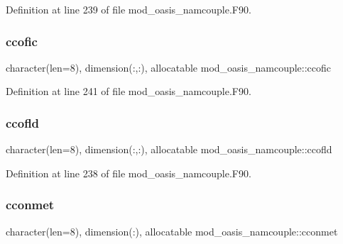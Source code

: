 Definition at line 239 of file mod\+\_\+oasis\+\_\+namcouple.\+F90.

\mbox{\label{namespacemod__oasis__namcouple_a009543dda4495ab9b5ac3fcf15767682}} 
\subsubsection{\texorpdfstring{ccofic}{ccofic}}
{\footnotesize\ttfamily character(len=8), dimension(\+:,\+:), allocatable mod\+\_\+oasis\+\_\+namcouple\+::ccofic\hspace{0.3cm}{\ttfamily [private]}}



Definition at line 241 of file mod\+\_\+oasis\+\_\+namcouple.\+F90.

\mbox{\label{namespacemod__oasis__namcouple_af8d81a53bd28ddf6bfe19f5e05f1d867}} 
\subsubsection{\texorpdfstring{ccofld}{ccofld}}
{\footnotesize\ttfamily character(len=8), dimension(\+:,\+:), allocatable mod\+\_\+oasis\+\_\+namcouple\+::ccofld\hspace{0.3cm}{\ttfamily [private]}}



Definition at line 238 of file mod\+\_\+oasis\+\_\+namcouple.\+F90.

\mbox{\label{namespacemod__oasis__namcouple_a535fadd17426c228698e3a51fd54b605}} 
\subsubsection{\texorpdfstring{cconmet}{cconmet}}
{\footnotesize\ttfamily character(len=8), dimension(\+:), allocatable mod\+\_\+oasis\+\_\+namcouple\+::cconmet\hspace{0.3cm}{\ttfamily [private]}}



